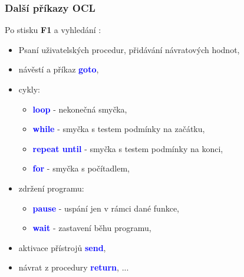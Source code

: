 	\begin{frame}
    \frametitle{Další příkazy OCL}
		
		\small
		Po stisku \textbf{F1} a vyhledání :
		
		
		\begin{itemize}
			\item Psaní uživatelských procedur, přidávání návratových hodnot,
			\item návěstí a příkaz \textcolor{blue}{\textbf{goto}},
			\item cykly:
			
			\begin{itemize}
				\item \textcolor{blue}{\textbf{loop}} - nekonečná smyčka,
				\item \textcolor{blue}{\textbf{while}} - smyčka s testem podmínky na začátku,
				\item \textcolor{blue}{\textbf{repeat until}} - smyčka s testem podmínky na konci,
				\item \textcolor{blue}{\textbf{for}} - smyčka s počítadlem,
			\end{itemize}
			
			\item zdržení programu:
			
			\begin{itemize}
				\item \textcolor{blue}{\textbf{pause}} - uspání jen v rámci dané funkce,
				\item \textcolor{blue}{\textbf{wait}} - zastavení běhu programu,
			\end{itemize}
			
			\item aktivace přístrojů \textcolor{blue}{\textbf{send}},
			\item návrat z procedury \textcolor{blue}{\textbf{return}}, ...
			
		\end{itemize}

	\end{frame}
